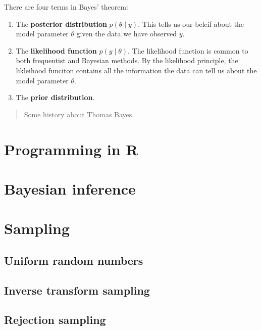 \documentclass[
]{book}
\providecommand{\tightlist}{%
  \setlength{\itemsep}{0pt}\setlength{\parskip}{0pt}}
\theoremstyle{definition}
\theoremstyle{definition}
\theoremstyle{definition}
\theoremstyle{definition}
\theoremstyle{remark}
\begin{document}
There are four terms in Bayes' theorem:

\begin{enumerate}
\def\labelenumi{\arabic{enumi}.}
\tightlist
\item
  The \textbf{posterior distribution} \(p(\theta \mid y)\). This tells us our beleif about the model parameter \(\theta\) given the data we have observed \(y\).
\item
  The \textbf{likelihood function} \(p(y \mid \theta)\). The likelihood function is common to both frequentist and Bayesian methods. By the likelihood principle, the likleihood funciton contains all the information the data can tell us about the model parameter \(\theta\).
\item
  The \textbf{prior distribution}.
\end{enumerate}

\begin{quote}
Some history about Thomas Bayes.
\end{quote}

\hypertarget{programming-in-r}{%
\chapter{Programming in R}\label{programming-in-r}}

\hypertarget{bayesian-inference}{%
\chapter{Bayesian inference}\label{bayesian-inference}}

\hypertarget{sampling}{%
\chapter{Sampling}\label{sampling}}

\hypertarget{uniform-random-numbers}{%
\section{Uniform random numbers}\label{uniform-random-numbers}}

\hypertarget{inverse-transform-sampling}{%
\section{Inverse transform sampling}\label{inverse-transform-sampling}}

\hypertarget{rejection-sampling}{%
\section{Rejection sampling}\label{rejection-sampling}}
\end{document}
